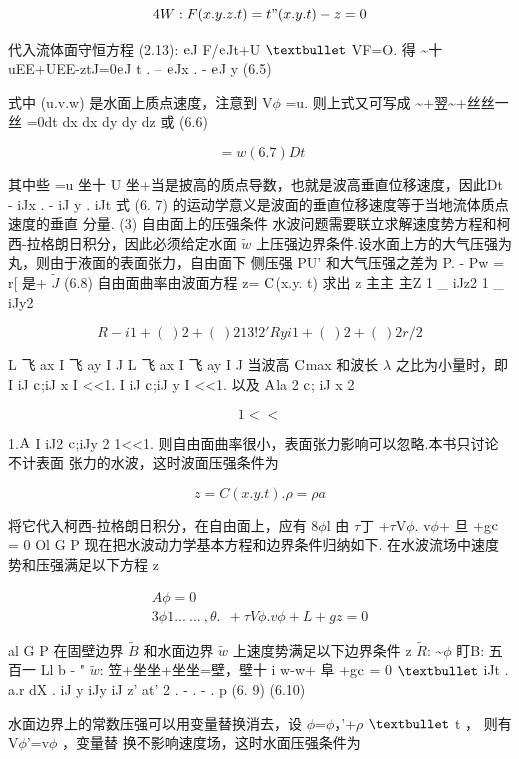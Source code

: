 \[4W: F(x.y.z.t) = t"(x.y.t) - z = 0\]

代入流体面守恒方程 (2.13): ${\rm e}$J F/${\rm e}$Jt+U ${\rm •}$ VF=O. 得 \textasciitilde{}十 uEE+UEE-ztJ=0${\rm e}$J t . -- ${\rm e}$Jx . - ${\rm e}$J y (6.5)

式中 (u.v.w) 是水面上质点速度，注意到 V$\phi$ =u. 则上式又可写成 \textasciitilde{}+翌\textasciitilde{}+丝丝一丝 =0dt dx dx dy dy dz 或 (6.6)

\[~ = w (6.7) Dt\]

其中些 =u 坐十 U 坐+当是披高的质点导数，也就是波高垂直位移速度，因此Dt - iJx . - iJ y . iJt 式 (6. 7) 的运动学意义是波面的垂直位移速度等于当地流体质点速度的垂直 分量. (3) 自由面上的压强条件 水波问题需要联立求解速度势方程和柯西-拉格朗日积分，因此必须给定水面 $\tilde{w}$ 上压强边界条件.设水面上方的大气压强为丸，则由于液面的表面张力，自由面下 侧压强 PU' 和大气压强之差为 P. - Pw = r[ 是+ $\tilde{J}$ (6.8) 自由面曲率由波面方程 z= ${\rm C}$(x.y. t) 求出 z 主主 主Z 1 \_ iJz2 1 \_ iJy2

\[R - i1+(~)2 +(~)21 3!2' Ry i1+(~)2 +(~)2r/2\]

L 飞 ax I 飞 ay I J L 飞 ax I 飞 ay I J 当波高 ${\rm C}$max 和波长 $\lambda$ 之比为小量时，即 I iJ ${\rm c}$;iJ x I <<1. I iJ ${\rm c}$;iJ y I <<1. 以及 ${\rm A}$la 2 ${\rm c}$; iJ x 2

\[1<<\]

1.${\rm A}$ I iJ2 ${\rm c}$;iJy 2 1<<1. 则自由面曲率很小，表面张力影响可以忽略.本书只讨论不计表面 张力的水波，这时波面压强条件为

\[z = C(x.y.t). \rho =\rho a\]

将它代入柯西-拉格朗日积分，在自由面上，应有 8$\phi$l 由 $\tau$丁 +$\tau$V$\phi$. v$\phi$+ 旦 +g${\rm c}$ = 0 Ol G P 现在把水波动力学基本方程和边界条件归纳如下. 在水波流场中速度势和压强满足以下方程 z

\begin{gather*}
A\phi =0\\
3\phi 1...~ ...~,  \theta  .~~+\tau V\phi . v\phi  +L+ gz = 0
\end{gather*}

al G P 在固壁边界 $\tilde{B}$ 和水面边界 $\tilde{w}$ 上速度势满足以下边界条件 z $\tilde{R}$: \textasciitilde{}$\phi$ 盯B: 五百一 Ll b - " $\tilde{w}$: 笠+坐坐+坐坐=壁，壁十 i w-w+ 阜 +g${\rm c}$ = 0 ${\rm •}$ iJt . a.r dX . iJ y iJy iJ z' at' 2 . - . - . p (6. 9) (6.10)

水面边界上的常数压强可以用变量替换消去，设 $\phi$=$\phi$，'+$\rho$ ${\rm •}$ t ， 则有 V$\phi$'=v$\phi$ ，变量替 换不影响速度场，这时水面压强条件为

